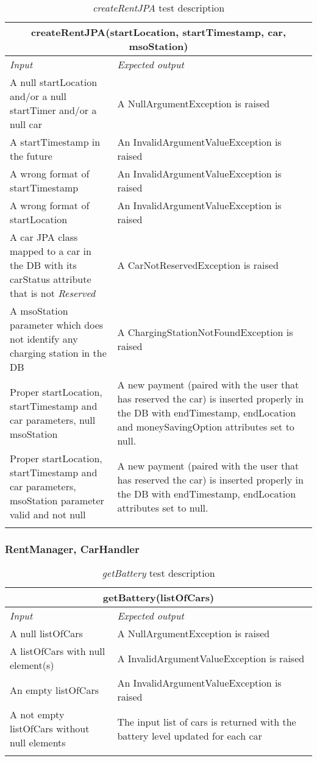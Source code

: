 \begin{longtable}{p{0.35\linewidth}p{0.65\linewidth}}
\multicolumn{2}{c}{\textbf{createRentJPA(startLocation, startTimestamp, car, msoStation)}} \\
\toprule
\emph{Input} & \emph{Expected output} \\
\midrule
A null startLocation and/or a null startTimer and/or a null car & A NullArgumentException is raised\\
\midrule
A startTimestamp in the future & An InvalidArgumentValueException is raised \\
\midrule
A wrong format of startTimestamp & An InvalidArgumentValueException is raised \\
\midrule
A wrong format of startLocation & An InvalidArgumentValueException is raised \\
\midrule
A car JPA class mapped to a car in the DB with its carStatus attribute that is not \emph{Reserved} & A CarNotReservedException is raised \\
\midrule
A msoStation parameter which does not identify any charging station in the DB & A ChargingStationNotFoundException is raised \\
\midrule
Proper startLocation, startTimestamp and car parameters, null msoStation & A new payment (paired with the user that has reserved the car) is inserted properly in the DB with endTimestamp, endLocation and moneySavingOption attributes set to null.\\
\midrule
Proper \mbox{startLocation}, startTimestamp and car parameters, \mbox{msoStation} parameter valid and not null & A new payment (paired with the user that has reserved the car) is inserted properly in the DB with endTimestamp, endLocation attributes set to null.\\
\bottomrule
\caption{\label{tbk:createRentJPA}\emph{createRentJPA} test description}
\end{longtable}


\clearpage

\subsubsection{RentManager, CarHandler}

\begin{longtable}{p{0.35\linewidth}p{0.65\linewidth}}
\multicolumn{2}{c}{\textbf{getBattery(listOfCars)}} \\
\toprule
\emph{Input} & \emph{Expected output} \\
\midrule
A null listOfCars & A NullArgumentException is raised\\
\midrule
A listOfCars with null element(s) & A InvalidArgumentValueException is raised\\
\midrule
An empty listOfCars & An InvalidArgumentValueException is raised \\
\midrule
A not empty listOfCars without null elements & The input list of cars is returned with the battery level updated for each car\\
\bottomrule
\caption{\emph{getBattery} test description}
\end{longtable}



